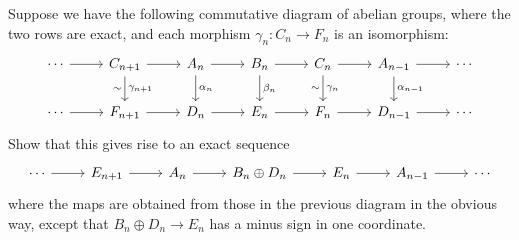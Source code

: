 \begin{exercise}\label{Barratt Whitehead lem}
Suppose we have the following commutative diagram of abelian groups, where the two rows are exact, and each morphism $\gamma_n:C_n\to F_n$ is an isomorphism:
\[\begin{tikzcd}
\cdots\ar[r]&C_{n+1}\ar[d,"\gamma_{n+1}","\sim"']\ar[r]&A_n\ar[d,"\alpha_n"]\ar[r]&B_n\ar[d,"\beta_n"]\ar[r]&C_n\ar[d,"\gamma_n","\sim"']\ar[r]&A_{n-1}\ar[d,"\alpha_{n-1}"]\ar[r]&\cdots\\
\cdots\ar[r]&F_{n+1}\ar[r]&D_n\ar[r]&E_n\ar[r]&F_n\ar[r]&D_{n-1}\ar[r]&\cdots
\end{tikzcd}\]
Show that this gives rise to an exact sequence
\[\begin{tikzcd}
\cdots\ar[r]&E_{n+1}\ar[r]&A_n\ar[r]&B_n\oplus D_n\ar[r]&E_n\ar[r]&A_{n-1}\ar[r]&\cdots
\end{tikzcd}\]
where the maps
are obtained from those in the previous diagram in the obvious way, except that
$B_n\oplus D_n\to E_n$ has a minus sign in one coordinate.
\end{exercise}
